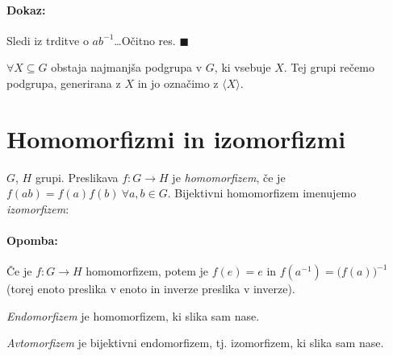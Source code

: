 \paragraph{Dokaz:} Sledi iz trditve o $ab^{-1}$\ldots O\v citno res. $\blacksquare$

\begin{posledica}
	$\forall X \subseteq G$ obstaja najmanj\v sa podgrupa v $G$, ki vsebuje $X$. Tej grupi re\v cemo podgrupa, generirana z $X$ in jo ozna\v cimo z $\langle X \rangle$.
\end{posledica}

\section{Homomorfizmi in izomorfizmi}

\begin{defin}
$G$, $H$ grupi. Preslikava $f : G \to H$ je \emph{homomorfizem}, \v ce je $f(ab) = f(a) f(b)\ \forall a,b \in G$. Bijektivni homomorfizem imenujemo \emph{izomorfizem}:

\paragraph{Opomba:} \v Ce je $f : G \to H$ homomorfizem, potem je $f(e) = e$ in $f(a^{-1}) = \big(f(a)\big)^{-1}$ (torej enoto preslika v enoto in inverze preslika v inverze).
\end{defin}

\begin{defin}
	\emph{Endomorfizem} je homomorfizem, ki slika sam nase.

	\ni \emph{Avtomorfizem} je bijektivni endomorfizem, tj. izomorfizem, ki slika sam nase.
\end{defin}

